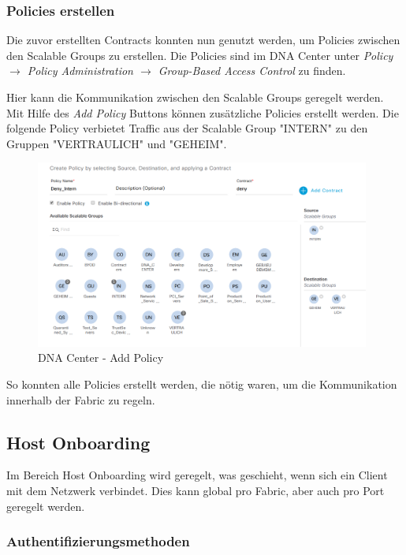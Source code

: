 \subsubsection{Policies erstellen}
\label{create-policies}
Die zuvor erstellten Contracts konnten nun genutzt werden, um Policies zwischen den Scalable Groups zu erstellen. Die Policies sind im DNA Center unter \textit{Policy $\rightarrow$ Policy Administration $\rightarrow$ Group-Based Access Control} zu finden.

Hier kann die Kommunikation zwischen den Scalable Groups geregelt werden. Mit Hilfe des \textit{Add Policy} Buttons können zusätzliche Policies erstellt werden. Die folgende Policy verbietet Traffic aus der Scalable Group "INTERN" zu den Gruppen "VERTRAULICH" und "GEHEIM".

\begin{figure}[H]
	\centering
	\includegraphics[width=11cm]{img/secondtry/dna-center-add-policy.png}
	\caption{DNA Center - Add Policy}
	\label{fig:dna-center-add-policy}
\end{figure}

So konnten alle Policies erstellt werden, die nötig waren, um die Kommunikation innerhalb der Fabric zu regeln.

\subsection{Host Onboarding}

Im Bereich Host Onboarding wird geregelt, was geschieht, wenn sich ein Client mit dem Netzwerk verbindet. Dies kann global pro Fabric, aber auch pro Port geregelt werden.


\subsubsection{Authentifizierungsmethoden}
\label{authentifizierungsmethoden}

